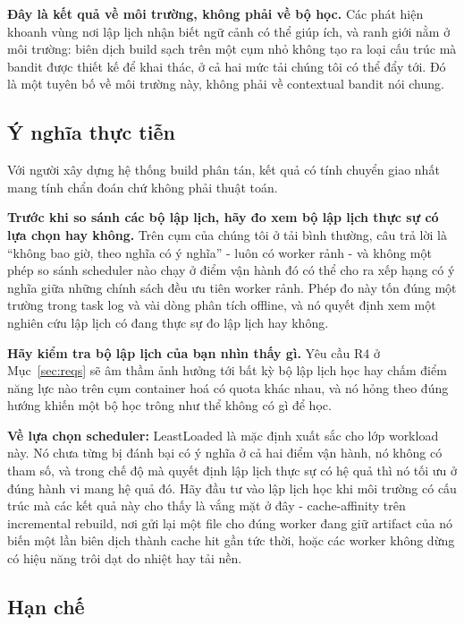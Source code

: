 \documentclass[final,5p,times,twocolumn]{elsarticle}
\begin{document}
\textbf{Đây là kết quả về môi trường, không phải về bộ học.} Các phát hiện khoanh vùng nơi lập lịch nhận biết ngữ cảnh có thể giúp ích, và ranh giới nằm ở môi trường: biên dịch build sạch trên một cụm nhỏ không tạo ra loại cấu trúc mà bandit được thiết kế để khai thác, ở cả hai mức tải chúng tôi có thể đẩy tới. Đó là một tuyên bố về môi trường này, không phải về contextual bandit nói chung.

\subsection{Ý nghĩa thực tiễn}

Với người xây dựng hệ thống build phân tán, kết quả có tính chuyển giao nhất mang tính chẩn đoán chứ không phải thuật toán.

\textbf{Trước khi so sánh các bộ lập lịch, hãy đo xem bộ lập lịch thực sự có lựa chọn hay không.} Trên cụm của chúng tôi ở tải bình thường, câu trả lời là ``không bao giờ, theo nghĩa có ý nghĩa'' - luôn có worker rảnh - và không một phép so sánh scheduler nào chạy ở điểm vận hành đó có thể cho ra xếp hạng có ý nghĩa giữa những chính sách đều ưu tiên worker rảnh. Phép đo này tốn đúng một trường trong task log và vài dòng phân tích offline, và nó quyết định xem một nghiên cứu lập lịch có đang thực sự đo lập lịch hay không.

\textbf{Hãy kiểm tra bộ lập lịch của bạn nhìn thấy gì.} Yêu cầu R4 ở Mục~\ref{sec:reqs} sẽ âm thầm ảnh hưởng tới bất kỳ bộ lập lịch học hay chấm điểm năng lực nào trên cụm container hoá có quota khác nhau, và nó hỏng theo đúng hướng khiến một bộ học trông như thể không có gì để học.

\textbf{Về lựa chọn scheduler:} LeastLoaded là mặc định xuất sắc cho lớp workload này. Nó chưa từng bị đánh bại có ý nghĩa ở cả hai điểm vận hành, nó không có tham số, và trong chế độ mà quyết định lập lịch thực sự có hệ quả thì nó tối ưu ở đúng hành vi mang hệ quả đó. Hãy đầu tư vào lập lịch học khi môi trường có cấu trúc mà các kết quả này cho thấy là vắng mặt ở đây - cache-affinity trên incremental rebuild, nơi gửi lại một file cho đúng worker đang giữ artifact của nó biến một lần biên dịch thành cache hit gần tức thời, hoặc các worker không dừng có hiệu năng trôi dạt do nhiệt hay tải nền.

\subsection{Hạn chế}
\label{sec:limitations}
\end{document}
